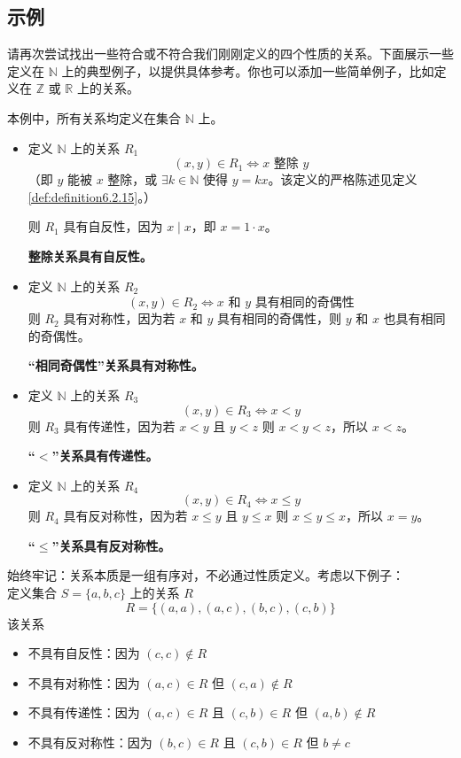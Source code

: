 
\subsection{示例}

请再次尝试找出一些符合或不符合我们刚刚定义的四个性质的关系。下面展示一些定义在 $\mathbb{N}$ 上的典型例子，以提供具体参考。你也可以添加一些简单例子，比如定义在 $\mathbb{Z}$ 或 $\mathbb{R}$ 上的关系。\\

\begin{example}
    本例中，所有关系均定义在集合 $\mathbb{N}$ 上。
    \begin{itemize}
        \item 定义 $\mathbb{N}$ 上的关系 $R_1$
        \[(x, y) \in R_1 \iff x \text{\ 整除\ } y\]
        （即 $y$ 能被 $x$ 整除，或 $\exists k \in \mathbb{N}$ 使得 $y=kx$。该定义的严格陈述见定义 \ref{def:definition6.2.15}。）

        则 $R_1$ 具有自反性，因为 $x \mid x$，即 $x=1 \cdot x$。

        \textbf{整除关系具有自反性。}
        \item 定义 $\mathbb{N}$ 上的关系 $R_2$
        \[(x, y) \in R_2 \iff x \text{\ 和\ } y \text{\ 具有相同的奇偶性}\]
        则 $R_2$ 具有对称性，因为若 $x$ 和 $y$ 具有相同的奇偶性，则 $y$ 和 $x$ 也具有相同的奇偶性。

        \textbf{``相同奇偶性''关系具有对称性。}
        \item 定义 $\mathbb{N}$ 上的关系 $R_3$
        \[(x, y) \in R_3 \iff x < y\]
        则 $R_3$ 具有传递性，因为若 $x<y$ 且 $y<z$ 则 $x<y<z$，所以 $x<z$。

        \textbf{``$<$''关系具有传递性。}
        \item 定义 $\mathbb{N}$ 上的关系 $R_4$
        \[(x, y) \in R_4 \iff x \le y\]
        则 $R_4$ 具有反对称性，因为若 $x \le y$ 且 $y \le x$ 则 $x \le y \le x$，所以 $x=y$。

        \textbf{``$\le$''关系具有反对称性。}
    \end{itemize}
\end{example}

\begin{example}
    始终牢记：关系本质是一组有序对，不必通过性质定义。考虑以下例子：\\
    定义集合 $S=\{a,b,c\}$ 上的关系 $R$
    \[R = \{(a, a),(a, c),(b, c),(c, b)\}\]
    该关系
    \begin{itemize}
        \item 不具有自反性：\quad 因为 $(c,c) \notin R$
        \item 不具有对称性：\quad 因为 $(a, c) \in R$ 但 $(c, a) \notin R$
        \item 不具有传递性：\quad 因为 $(a, c) \in R$ 且 $(c, b) \in R$ 但 $(a, b) \notin R$
        \item 不具有反对称性：因为 $(b, c) \in R$ 且 $(c, b) \in R$ 但 $b \ne c$
    \end{itemize}
\end{example}

